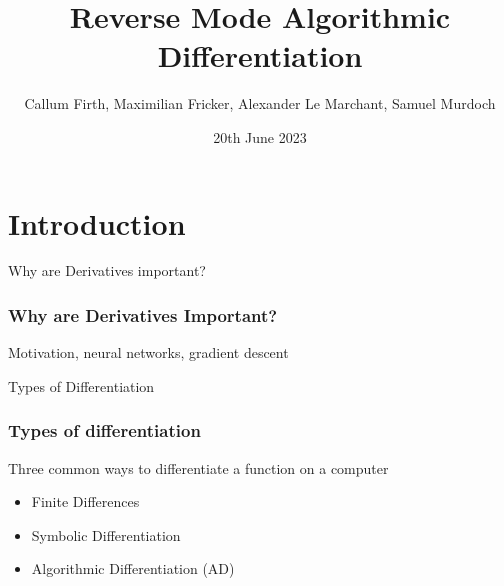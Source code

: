 \documentclass{beamer}
\title{Reverse Mode Algorithmic Differentiation}
\author[Group 18]{Callum Firth, Maximilian Fricker, Alexander Le Marchant, Samuel Murdoch}
\institute[Imperial]{Imperial College London}
\date{20th June 2023}
\begin{document}
\frame{\titlepage}



% 





\section{Introduction}

\begin{frame}{Why are Derivatives important?}
\frametitle{Why are Derivatives Important?}
Motivation, neural networks, gradient descent
\end{frame}

\begin{frame}{Types of Differentiation}
\frametitle{Types of differentiation}
Three common ways to differentiate a function on a computer
\begin{itemize}
    \item Finite Differences
    \item Symbolic Differentiation
    \item Algorithmic Differentiation (AD)
\end{itemize}
\end{frame}
\end{document}
